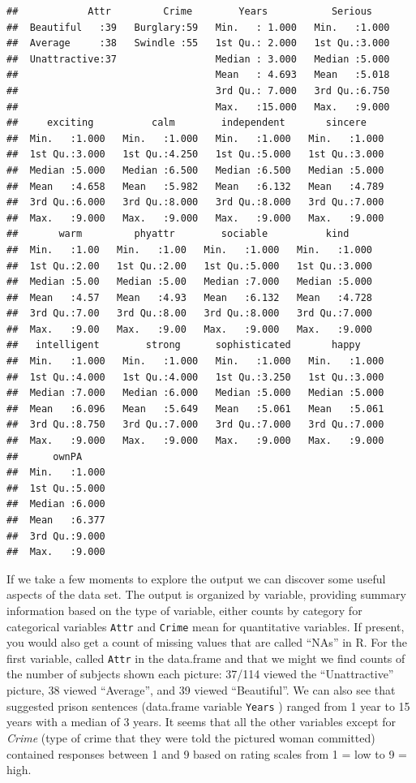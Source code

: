 \documentclass[]{book}
\theoremstyle{definition}
\theoremstyle{definition}
\theoremstyle{remark}
\begin{document}
\begin{verbatim}
##            Attr         Crime        Years           Serious     
##  Beautiful   :39   Burglary:59   Min.   : 1.000   Min.   :1.000  
##  Average     :38   Swindle :55   1st Qu.: 2.000   1st Qu.:3.000  
##  Unattractive:37                 Median : 3.000   Median :5.000  
##                                  Mean   : 4.693   Mean   :5.018  
##                                  3rd Qu.: 7.000   3rd Qu.:6.750  
##                                  Max.   :15.000   Max.   :9.000  
##     exciting          calm        independent       sincere     
##  Min.   :1.000   Min.   :1.000   Min.   :1.000   Min.   :1.000  
##  1st Qu.:3.000   1st Qu.:4.250   1st Qu.:5.000   1st Qu.:3.000  
##  Median :5.000   Median :6.500   Median :6.500   Median :5.000  
##  Mean   :4.658   Mean   :5.982   Mean   :6.132   Mean   :4.789  
##  3rd Qu.:6.000   3rd Qu.:8.000   3rd Qu.:8.000   3rd Qu.:7.000  
##  Max.   :9.000   Max.   :9.000   Max.   :9.000   Max.   :9.000  
##       warm         phyattr        sociable          kind      
##  Min.   :1.00   Min.   :1.00   Min.   :1.000   Min.   :1.000  
##  1st Qu.:2.00   1st Qu.:2.00   1st Qu.:5.000   1st Qu.:3.000  
##  Median :5.00   Median :5.00   Median :7.000   Median :5.000  
##  Mean   :4.57   Mean   :4.93   Mean   :6.132   Mean   :4.728  
##  3rd Qu.:7.00   3rd Qu.:8.00   3rd Qu.:8.000   3rd Qu.:7.000  
##  Max.   :9.00   Max.   :9.00   Max.   :9.000   Max.   :9.000  
##   intelligent        strong      sophisticated       happy      
##  Min.   :1.000   Min.   :1.000   Min.   :1.000   Min.   :1.000  
##  1st Qu.:4.000   1st Qu.:4.000   1st Qu.:3.250   1st Qu.:3.000  
##  Median :7.000   Median :6.000   Median :5.000   Median :5.000  
##  Mean   :6.096   Mean   :5.649   Mean   :5.061   Mean   :5.061  
##  3rd Qu.:8.750   3rd Qu.:7.000   3rd Qu.:7.000   3rd Qu.:7.000  
##  Max.   :9.000   Max.   :9.000   Max.   :9.000   Max.   :9.000  
##      ownPA      
##  Min.   :1.000  
##  1st Qu.:5.000  
##  Median :6.000  
##  Mean   :6.377  
##  3rd Qu.:9.000  
##  Max.   :9.000
\end{verbatim}

If we take a few moments to explore the output we can discover some
useful aspects of the data set. The output is organized by variable,
providing summary information based on the type of variable, either
counts by category for categorical variables \texttt{Attr} and
\texttt{Crime} mean for quantitative variables. If present, you would
also get a count of missing values that are called ``NAs'' in R. For the
first variable, called \texttt{Attr} in the data.frame and that we might
we find counts of the number of subjects shown each picture: 37/114
viewed the ``Unattractive'' picture, 38 viewed ``Average'', and 39
viewed ``Beautiful''. We can also see that suggested prison sentences
(data.frame variable \texttt{Years} ) ranged from 1 year to 15 years
with a median of 3 years. It seems that all the other variables except
for \emph{Crime} (type of crime that they were told the pictured woman
committed) contained responses between 1 and 9 based on rating scales
from 1 = low to 9 = high.
\end{document}
